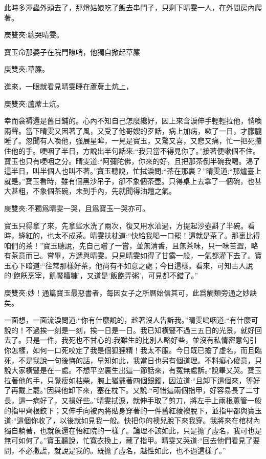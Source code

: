 \begin{parag}
    此時多渾蟲外頭去了，那燈姑娘吃了飯去串門子，只剩下晴雯一人，在外間房內爬著。\begin{note}庚雙夾:總哭晴雯。\end{note}寶玉命那婆子在院門瞭哨，他獨自掀起草簾\begin{note}庚雙夾:草簾。\end{note}進來，一眼就看見晴雯睡在蘆蓆土炕上，\begin{note}庚雙夾:蘆蓆土炕。\end{note}幸而衾褥還是舊日鋪的。心內不知自己怎麼纔好，因上來含淚伸手輕輕拉他，悄喚兩聲。當下晴雯又因著了風，又受了他哥嫂的歹話，病上加病，嗽了一日，才朦朧睡了。忽聞有人喚他，強展星眸，一見是寶玉，又驚又喜，又悲又痛，忙一把死攥住他的手。哽咽了半日，方說出半句話來:“我只當不得見你了。”接著便嗽個不住。寶玉也只有哽咽之分。晴雯道:“阿彌陀佛，你來的好，且把那茶倒半碗我喝。渴了這半日，叫半個人也叫不著。”寶玉聽說，忙拭淚問:“茶在那裏？”晴雯道:“那爐臺上就是。”寶玉看時，雖有個黑沙吊子，卻不象個茶壺。只得桌上去拿了一個碗，也甚大甚粗，不象個茶碗，未到手內，先就聞得油羶之氣。\begin{note}庚雙夾:不獨爲晴雯一哭，且爲寶玉一哭亦可。\end{note}寶玉只得拿了來，先拿些水洗了兩次，復又用水汕過，方提起沙壺斟了半碗。看時，絳紅的，也太不成茶。晴雯扶枕道:“快給我喝一口罷！這就是茶了。那裏比得咱們的茶！”寶玉聽說，先自己嚐了一嘗，並無清香，且無茶味，只一味苦澀，略有茶意而已。嘗畢，方遞與晴雯。只見晴雯如得了甘露一般，一氣都灌下去了。寶玉心下暗道:“往常那樣好茶，他尚有不如意之處；今日這樣。看來，可知古人說的‘飽飫烹宰，飢饜糟糠’，又道是‘飯飽弄粥’，可見都不錯了。”\begin{note}庚雙夾:妙！通篇寶玉最惡書者，每因女子之所曆始信其可，此爲觸類旁通之妙訣矣。\end{note}一面想，一面流淚問道:“你有什麼說的，趁著沒人告訴我。”晴雯嗚咽道:“有什麼可說的！不過挨一刻是一刻，挨一日是一日。我已知橫豎不過三五日的光景，就好回去了。只是一件，我死也不甘心的:我雖生的比別人略好些，並沒有私情密意勾引你怎樣，如何一口死咬定了我是個狐狸精！我太不服。今日既已擔了虛名，而且臨死，不是我說一句後悔的話，早知如此，我當日也另有個道理。不料癡心傻意，只說大家橫豎是在一處。不想平空裏生出這一節話來，有冤無處訴。”說畢又哭。寶玉拉著他的手，只覺瘦如枯柴，腕上猶戴著四個銀鐲，因泣道:“且卸下這個來，等好了再戴上罷。”因與他卸下來，塞在枕下。又說:“可惜這兩個指甲，好容易長了二寸長，這一病好了，又損好些。”晴雯拭淚，就伸手取了剪刀，將左手上兩根蔥管一般的指甲齊根鉸下；又伸手向被內將貼身穿著的一件舊紅綾襖脫下，並指甲都與寶玉道:“這個你收了，以後就如見我一般。快把你的襖兒脫下來我穿。我將來在棺材內獨自躺著，也就象還在怡紅院的一樣了。論理不該如此，只是擔了虛名，我可也是無可如何了。”寶玉聽說，忙寬衣換上，藏了指甲。晴雯又哭道:“回去他們看見了要問，不必撒謊，就說是我的。既擔了虛名，越性如此，也不過這樣了。”
\end{parag}


